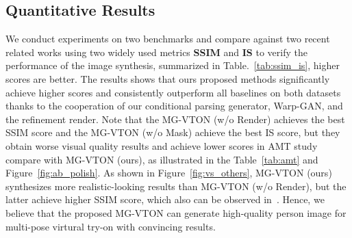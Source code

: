 \documentclass[10pt,twocolumn,letterpaper]{article}
\begin{document}
\subsection{Quantitative Results}
We conduct experiments on two benchmarks and compare against two recent related works using two widely used metrics \textbf{SSIM} and \textbf{IS} to verify the performance of the image synthesis, summarized in Table.~\ref{tab:ssim_is}, higher scores are better. The results shows that ours proposed methods significantly achieve higher scores and consistently outperform all baselines on both datasets thanks to the cooperation of our conditional parsing generator, Warp-GAN, and the refinement render. Note that the MG-VTON (w/o Render) achieves the best SSIM score and the MG-VTON (w/o Mask) achieve the best IS score, but they obtain worse visual quality results and achieve lower scores in AMT study compare with MG-VTON (ours), as illustrated in the Table~\ref{tab:amt} and Figure~\ref{fig:ab_polish}. As shown in Figure~\ref{fig:vs_others}, MG-VTON (ours) synthesizes more realistic-looking results than MG-VTON (w/o Render), but the latter achieve higher SSIM score, which also can be observed in~\cite{johnson2016perceptual}. Hence, we believe that the proposed MG-VTON can generate high-quality person image for multi-pose virtural try-on with convincing results.


\begin{table}[htbp]
\centering
\caption{Comparisons on MPV and DeepFashion. }
\vspace{2mm}
\label{tab:ssim_is}
\vspace{-2mm}
\end{table}
\end{document}
